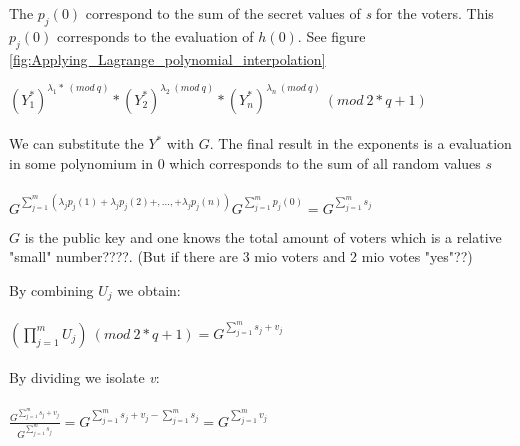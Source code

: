\noindent
The \begin{math}p_j(0) \end{math} correspond to the sum of the secret values of \textit{s} for the voters. This \begin{math}p_j(0)\end{math} corresponds to the evaluation of \begin{math}h(0)\end{math}. See figure  \ref{fig:Applying_Lagrange_polynomial_interpolation}

\begin{infobox}
\begin{math}(Y_1^*)^{\lambda_1 * \ (mod \ q)} * (Y_2^*)^{\lambda_2 \ (mod \ q)} * (Y_n^*)^{\lambda_n \ (mod \ q)} \ (mod \ 2*q+1) \end{math}\\\\
We can substitute the $Y^*$ with $G$. The final result in the exponents is a evaluation in some polynomium in $0$ which corresponds to the sum of all random values $s$\\\\
$G^{ \sum\limits_{j=1}^m (\lambda_j p_j(1)+\lambda_j p_j(2)+,...,+\lambda_{j}p_j(n))} G^{ \sum\limits_{j=1}^m p_j(0)}= G^{ \sum\limits_{j=1}^m s_j}  $
\end{infobox}



\noindent
\begin{math}G\end{math} is the public key and one knows the total amount of voters which is a relative "small" number????. (But if there are 3 mio voters and 2 mio votes "yes"??)


\noindent
\begin{infobox}
By combining \begin{math}U_j \end{math} we obtain: \\ \\
\begin{math} (\prod\limits_{j=1}^{m} U_{j}) \ (mod \ 2*q+1)=  G^{ \sum\limits_{j=1}^m s_j +v_j}\end{math} \\ \\
By dividing we isolate \textit{v}: \\ \\
\begin{math}\frac{G^{ \sum\limits_{j=1}^m s_j +v_j}}{{ G^{ \sum\limits_{j=1}^m s_j} }} =G^{ \sum\limits_{j=1}^m s_j +v_j -\sum\limits_{j=1}^m s_j} = G^{ \sum\limits_{j=1}^m v_j}  \end{math}
\end{infobox}


